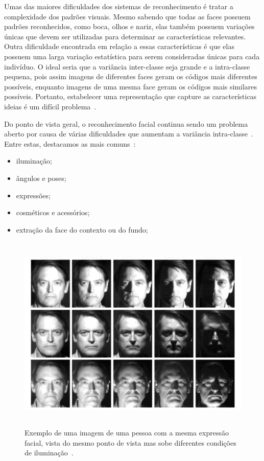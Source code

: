 Umas das maiores dificuldades dos sistemas de reconhecimento é tratar a complexidade dos padrões visuais. Mesmo sabendo que todas as faces possuem padrões reconhecidos, como boca, olhos e nariz, elas também possuem variações únicas que devem ser utilizadas para determinar as características relevantes. Outra dificuldade encontrada em relação a essas características é que elas possuem uma larga variação estatística para serem consideradas únicas para cada indivíduo. O ideal seria que a variância inter-classe seja grande e a intra-classe pequena, pois assim imagens de diferentes faces geram os códigos mais diferentes possíveis, enquanto imagens de uma mesma face geram os códigos mais similares possíveis. Portanto, estabelecer uma representação que capture as características ideias é um difícil problema~\cite{saocarlos}.

Do ponto de vista geral, o reconhecimento facial continua sendo um problema aberto por causa de várias dificuldades que aumentam a variância intra-classe~\cite{hong}. Entre estas, destacamos as mais comuns~\cite{saocarlos}:

	\begin{itemize}
		\item iluminação;
		\item ângulos e poses;
		\item expressões;
		\item cosméticos e acessórios;
		\item extração da face do contexto ou do fundo;
	\end{itemize}

	\begin{figure}[hbt]
		\begin{center}
			\includegraphics[height=9.5cm,width=12.5cm]{figuras/2.FundamentacaoTeorica/diferencailuminacao.png}
		\end{center}
		\caption{Exemplo de uma imagem de uma pessoa com a mesma expressão facial, vista do mesmo ponto de vista mas sobe diferentes condições de iluminação~\cite{belhumeur}.}
		\label{diferencailuminacao}
	\end{figure}

